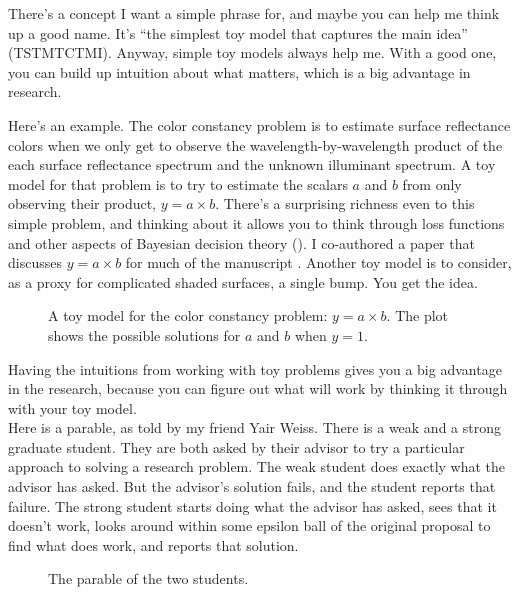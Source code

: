 There's a concept I want a
simple phrase for, and maybe you can help me think up a good name.
It's ``the simplest toy model that captures the main
idea''  (TSTMTCTMI).    Anyway, simple toy models
always help me.  With a good one,
you can build up intuition about what matters, which is a big
advantage in research.

Here's an example.  The color constancy problem is to estimate surface
reflectance colors when we only get to observe the
wavelength-by-wavelength product of the each surface
reflectance spectrum and the unknown
illuminant spectrum.  A toy model for that problem is to try to estimate the scalars
$a$ and $b$ from only observing their product, $y = a \times b$.  There's a
surprising richness even to this simple problem, and thinking about it
allows you to think through loss functions and other aspects of
Bayesian decision theory (\fig{\ref{fig:toy}}).  I co-authored a paper that discusses
$y = a \times b$ for much of the manuscript \cite{Freeman95a}.
Another toy model is to consider,  as a proxy for complicated shaded surfaces, a
single bump.  You get the idea.
\begin{figure}[h]
  \centerline{
    }
  \caption{A toy model for the color constancy problem:  $y = a \times b$. The plot shows the possible solutions for $a$ and $b$ when $y=1$.}
  \label{fig:toy}
\end{figure}

Having the intuitions from working with toy problems gives you a big advantage in the research, because you can figure out what will work by thinking it through with your toy model. \\

  Here is a parable, as told by my friend Yair Weiss.  There is a weak
and a strong graduate student.  They are both asked by their advisor
to try a particular approach to solving a research problem.
The weak student does exactly what the advisor has asked.  But the advisor's
solution fails, and the student reports that failure.
The strong student starts doing what the advisor has asked, sees that
it doesn't work, looks around within some epsilon ball
of the original proposal to find what does work, and reports that solution.
\begin{figure}[htpb!]
  \centerline{
    }
  \caption{The parable of the two students.}
  \label{fig:students}
\end{figure}


